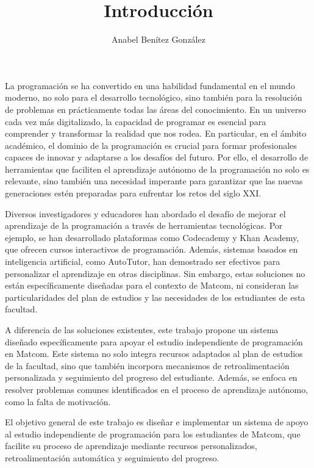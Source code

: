 \documentclass{article}
\title{Introducción}
\author{Anabel Benítez González}
\date{}
\begin{document}
\maketitle

La programación se ha convertido en una habilidad fundamental en el mundo moderno, no solo para el desarrollo tecnológico, sino también para la resolución de problemas en prácticamente todas las áreas del conocimiento. En un universo cada vez más digitalizado, la capacidad de programar es esencial para comprender y transformar la realidad que nos rodea. En particular, en el ámbito académico, el dominio de la programación es crucial para formar profesionales capaces de innovar y adaptarse a los desafíos del futuro. Por ello, el desarrollo de herramientas que faciliten el aprendizaje autónomo de la programación no solo es relevante, sino también una necesidad imperante para garantizar que las nuevas generaciones estén preparadas para enfrentar los retos del siglo XXI.



Diversos investigadores y educadores han abordado el desafío de mejorar el aprendizaje de la programación a través de herramientas tecnológicas. Por ejemplo, se han desarrollado plataformas como Codecademy y Khan Academy, que ofrecen cursos interactivos de programación. Además, sistemas basados en inteligencia artificial, como AutoTutor, han demostrado ser efectivos para personalizar el aprendizaje en otras disciplinas. Sin embargo, estas soluciones no están específicamente diseñadas para el contexto de Matcom, ni consideran las particularidades del plan de estudios y las necesidades de los estudiantes de esta facultad.

A diferencia de las soluciones existentes, este trabajo propone un sistema diseñado específicamente para apoyar el estudio independiente de programación en Matcom. Este sistema no solo integra recursos adaptados al plan de estudios de la facultad, sino que también incorpora mecanismos de retroalimentación personalizada y seguimiento del progreso del estudiante. Además, se enfoca en resolver problemas comunes identificados en el proceso de aprendizaje autónomo, como la falta de motivación.

El objetivo general de este trabajo es diseñar e implementar un sistema de apoyo al estudio independiente de programación para los estudiantes de Matcom, que facilite su proceso de aprendizaje mediante recursos personalizados, retroalimentación automática y seguimiento del progreso.
\end{document}
